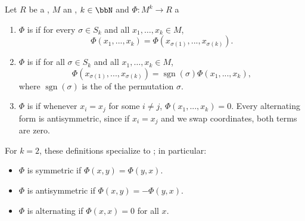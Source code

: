 \begin{definition} \label{definition:symmetric_antisymmetric_alternating_multilinear_forms_over_rings}
    Let $R$ be a , $M$ an , $k \in \bbN$ and $\Phi: M^k \to R$ a 
\begin{enumerate}
    \item $\Phi$ is  if for every  $\sigma \in S_k$ and all $x_1,\dots,x_k \in M$,
    $$
    \Phi(x_1, ..., x_k) = \Phi(x_{\sigma(1)}, ..., x_{\sigma(k)}).
    $$

    \item $\Phi$ is  if for all $\sigma \in S_k$ and all $x_1,\dots,x_k \in M$,
    $$ \Phi(x_{\sigma(1)}, ..., x_{\sigma(k)}) = \operatorname{sgn}(\sigma) \Phi(x_1, ..., x_k), $$
    where $\operatorname{sgn}(\sigma)$ is the  of the permutation $\sigma$.
    
    \item $\Phi$ is  if whenever $x_i = x_j$ for some $i \neq j$, $\Phi(x_1, ..., x_k) = 0$. Every alternating form is antisymmetric, since if $x_i = x_j$ and we swap coordinates, both terms are zero.
\end{enumerate}

For $k=2$, these definitions specialize to ; in particular:
\begin{itemize}
    \item $\Phi$ is symmetric if $\Phi(x, y) = \Phi(y, x)$.
    \item $\Phi$ is antisymmetric if $\Phi(x, y) = -\Phi(y, x)$.
    \item $\Phi$ is alternating if $\Phi(x, x) = 0$ for all $x$.
\end{itemize}
\end{definition}